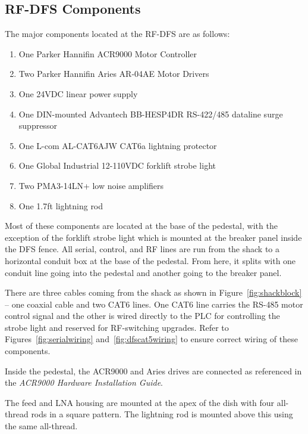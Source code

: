 \documentclass[titlepage]{article}
\begin{document}
\subsection{RF-DFS Components}\label{sec:higdfs}
The major components located at the RF-DFS are as follows:
\begin{enumerate}
  \item One Parker Hannifin ACR9000 Motor Controller
  \item Two Parker Hannifin Aries AR-04AE Motor Drivers
  \item One 24VDC linear power supply
  \item One DIN-mounted Advantech BB-HESP4DR RS-422/485 dataline surge suppressor
  \item One L-com AL-CAT6AJW CAT6a lightning protector
  \item One Global Industrial 12-110VDC forklift strobe light
  \item Two PMA3-14LN+ low noise amplifiers
  \item One 1.7ft lightning rod
\end{enumerate}
Most of these components are located at the base of the pedestal, with the exception of the forklift strobe light which is mounted at the breaker panel inside the DFS fence. All serial, control, and RF lines are run from the shack to a horizontal conduit box at the base of the pedestal. From here, it splits with one conduit line going into the pedestal and another going to the breaker panel.

There are three cables coming from the shack as shown in Figure~\ref{fig:shackblock} -- one coaxial cable and two CAT6 lines. One CAT6 line carries the RS-485 motor control signal and the other is wired directly to the PLC for controlling the strobe light and reserved for RF-switching upgrades. Refer to Figures~\ref{fig:serialwiring} and~\ref{fig:dfscat5wiring} to ensure correct wiring of these components.

Inside the pedestal, the ACR9000 and Aries drives are connected as referenced in the \textit{ACR9000 Hardware Installation Guide}.

The feed and LNA housing are mounted at the apex of the dish with four all-thread rods in a square pattern. The lightning rod is mounted above this using the same all-thread.
\end{document}
